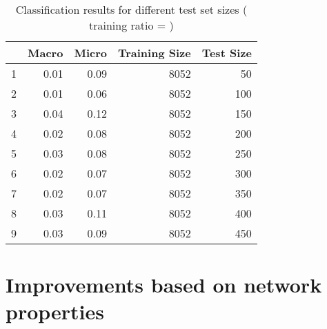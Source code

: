 \documentclass[11pt,letterpaper]{article}
\begin{document}
\begin{table}[ht]
	\centering
	\begin{tabular}{rrrrr}
		\hline
		& Macro & Micro & Training Size & Test Size \\ 
		\hline
		1 & 0.01 & 0.09 & 8052 & 50 \\ 
		2 & 0.01 & 0.06 & 8052 & 100 \\ 
		3 & 0.04 & 0.12 & 8052 & 150 \\ 
		4 & 0.02 & 0.08 & 8052 & 200 \\ 
		5 & 0.03 & 0.08 & 8052 & 250 \\ 
		6 & 0.02 & 0.07 & 8052 & 300 \\ 
		7 & 0.02 & 0.07 & 8052 & 350 \\ 
		8 & 0.03 & 0.11 & 8052 & 400 \\ 
		9 & 0.03 & 0.09 & 8052 & 450 \\ 
		\hline
	\end{tabular}
	\caption{Classification results for different test set sizes ( training ratio =  )}
\end{table}

\section*{Improvements based on network properties}
\end{document}
